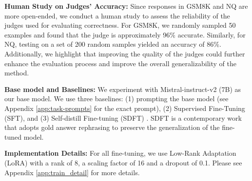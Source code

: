 \noindent \textbf{Human Study on Judges’ Accuracy:} Since responses in GSM8K and NQ are more open-ended, we conduct a human study to assess the reliability of the judges used for evaluating correctness. For GSM8K, we randomly sampled 50 examples and found that the judge is approximately 96\% accurate. Similarly, for NQ, testing on a set of 200 random samples yielded an accuracy of 86\%. Additionally, we highlight that improving the quality of the judges could further enhance the evaluation process and improve the overall generalizability of the method.

\vspace{0.2ex}
\noindent \textbf{Base model and Baselines:} 
We experiment with Mistral-instruct-v2 (7B) \cite{mistral} as our base model. We use three baselines: (1) prompting the base model (see Appendix \ref{app:task-prompts} for the exact prompt), (2) Supervised Fine-Tuning (SFT), and (3) Self-distill Fine-tuning (SDFT) \cite{yang2024self}. SDFT is a contemporary work that adopts gold answer rephrasing to preserve the generalization of the fine-tuned model.

\noindent \textbf{Implementation Details:} For all fine-tuning, we use Low-Rank Adaptation (LoRA) \cite{hu2022lora} with a rank of 8, a scaling factor of 16 and a dropout of 0.1. Please see Appendix \ref{app:train_detail} for more details. 

